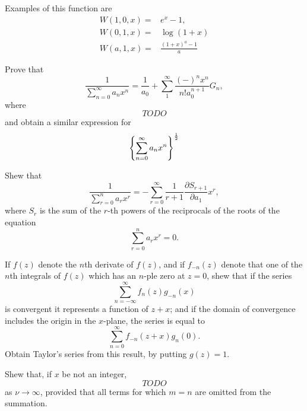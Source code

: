 \begin{wandwmiscexamples}
\begin{wandwmiscexample}
    Examples of this function are
    \begin{align*}
      W(1,0,x) =& e^{x} - 1, \\
      W(0,1,x) =& \log (1+x) \\
      W(a,1,x) =& \frac{(1+x)^{a} - 1}{a}
    \end{align*}
    \addexamplecitation{\Jezek}
  \end{wandwmiscexample}
  \begin{wandwmiscexample}
    Prove that
    $$
    \frac{1}{ \sum_{n=0}^{\infty} a_{n} x^{n}}
    =
    \frac{1}{a_{0}}
    +
    \sum_{1}^{\infty}
    \frac{ (-)^{n} x^{n} }{ n! a_{0}^{n+1} } G_{n},
    $$
    where
    $$
    TODO
    $$
    and obtain a similar expression for
    $$
    \left\{ 
      \sum_{n=0}^{\infty} a_{n} x^{n}
     \right\}^{\frac{1}{2}}
    $$
  \end{wandwmiscexample}
  \begin{wandwmiscexample}
    Shew that
    $$
    \frac{1}{ \sum_{r=0}^{n} a_{r} x^{r} }
    =
    -
    \sum_{r=0}^{\infty}
    \frac{1}{r+1}
    \frac{\partial S_{r+1}}{\partial a_{1}} x^{r},
    $$
    where $S_{r}$ is the sum of the $r$-th powers of the reciprocals of
    the roots of the equation
    $$
    \sum_{r=0}^{n} a_{r} x^{r} = 0.
    $$
  \end{wandwmiscexample}
  \begin{wandwmiscexample}
    If $f(z)$ denote the $n$th derivate of $f(z)$, and if
    $f_{-n}(z)$ denote that one of the $n$th integrals of
    $f(z)$ which has an $n$-ple zero at $z=0$,
    shew that if the series
    $$
    \sum_{n=-\infty}^{\infty} f_{n}(z) g_{-n}(x)
    $$
    is convergent it represents a function of $z + x$;
    and if the domain of convergence includes the origin in the
    $x$-plane, the series is equal to
    $$
    \sum_{n=0}^{\infty} f_{-n}(z+x) g_{n}(0).
    $$
    Obtain Taylor's series from this result, by putting $g(z) = 1$.
  \end{wandwmiscexample}
  \begin{wandwmiscexample}
    Shew that, if $x$ be not an integer,
    $$
    TODO
    $$
    as $\nu \rightarrow \infty$, provided that all terms for which
    $m = n$ are omitted from the summation.
  \end{wandwmiscexample}
  \begin{wandwmiscexample}

\end{wandwmiscexample}
\end{wandwmiscexamples}
